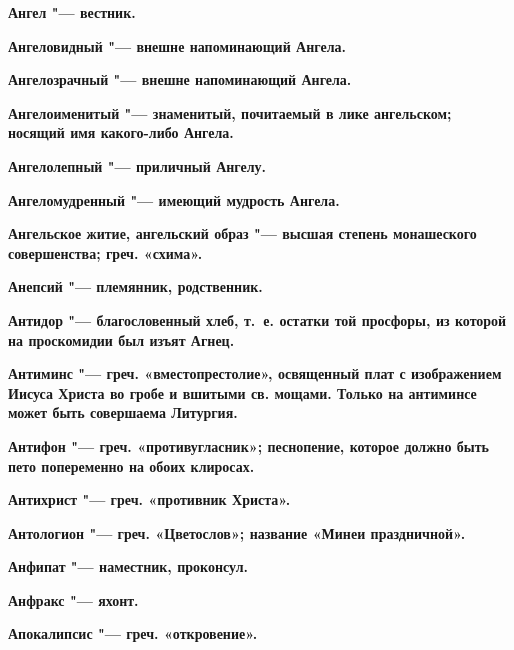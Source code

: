 \begin{multicols}{2}
\bfseries Ангел\normalfont{} "--- вестник. 




\bfseries Ангеловидный\normalfont{} "--- внешне напоминающий Ангела. 




\bfseries Ангелозрачный\normalfont{} "--- внешне напоминающий Ангела. 




\bfseries Ангелоименитый\normalfont{} "--- знаменитый, почитаемый в лике ангельском; носящий имя какого-либо Ангела. 




\bfseries Ангелолепный\normalfont{} "--- приличный Ангелу. 




\bfseries Ангеломудренный\normalfont{} "--- имеющий мудрость Ангела. 




\bfseries Ангельское житие, ангельский образ\normalfont{} "--- высшая степень монашеского совершенства; греч. «схима». 




\bfseries Анепсий\normalfont{} "--- племянник, родственник. 




\bfseries Антидор\normalfont{} "--- благословенный хлеб, т.~е. остатки той просфоры, из которой на проскомидии был изъят Агнец. 




\bfseries Антиминс\normalfont{} "--- греч. «вместопрестолие», освященный плат с изображением Иисуса Христа во гробе и вшитыми св. мощами. Только на антиминсе может быть совершаема Литургия. 




\bfseries Антифон\normalfont{} "--- греч. «противугласник»; песнопение, которое должно быть пето попеременно на обоих клиросах. 




\bfseries Антихрист\normalfont{} "--- греч. «противник Христа». 




\bfseries Антологион\normalfont{} "--- греч. «Цветослов»; название «Минеи праздничной». 




\bfseries Анфипат\normalfont{} "--- наместник, проконсул. 




\bfseries Анфракс\normalfont{} "--- яхонт. 




\bfseries Апокалипсис\normalfont{} "--- греч. «откровение». 





\end{multicols}

